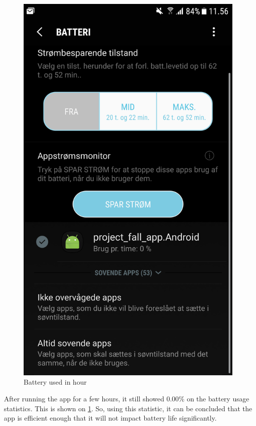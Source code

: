 \begin{figure}[h]
    \centering
    \includegraphics[scale=0.1]{Figures/batteryUsiged.png}
    \caption{Battery used in hour}
    \label{fig:batteryUsed}
\end{figure}

After running the app for a few hours, it still showed 0.00\% on the battery usage statistics. This is shown on \ref{fig:batteryUsed}.
So, using this statistic, it can be concluded that the app is efficient enough that it will not impact battery life significantly.

